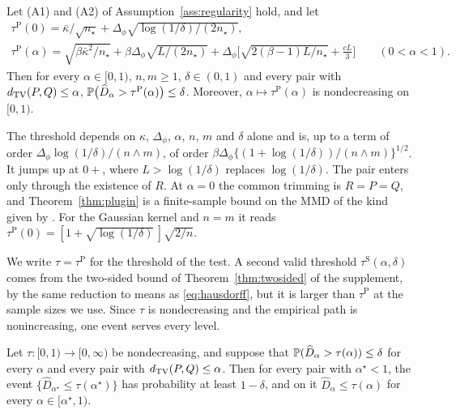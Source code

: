 \begin{theorem}
\label{thm:plugin}
Let (A1) and (A2) of Assumption~\ref{ass:regularity} hold, and let
\begin{gather*}
\tau^{\mathrm P}(0)=\bar\kappa/\sqrt{n_\star}+\Delta_\phi\sqrt{\log(1/\delta)/(2n_\star)},\\
\tau^{\mathrm P}(\alpha)=\sqrt{\beta \bar\kappa^2/n_\star}+\beta \Delta_\phi\sqrt{L/(2n_\star)}+\Delta_\phi\Big[\sqrt{2(\beta-1)L/n_\star}+\frac{cL}3\Big]
\qquad(0<\alpha<1).
\end{gather*}
Then for every $\alpha\in[0,1)$, $n,m\ge1$, $\delta\in(0,1)$ and every pair with $d_{\mathrm{TV}}(P,Q)\le\alpha$,
$\mathbb{P}\big(\widehat D_\alpha>\tau^{\mathrm P}(\alpha)\big)\le\delta$. Moreover, $\alpha\mapsto\tau^{\mathrm P}(\alpha)$
is nondecreasing on $[0,1)$.
\end{theorem}

The threshold depends on $\kappa$, $\Delta_\phi$, $\alpha$, $n$, $m$ and $\delta$ alone and is, up to a term of order
$\Delta_\phi\log(1/\delta)/(n\wedge m)$, of order $\beta \Delta_\phi\{(1+\log(1/\delta))/(n\wedge m)\}^{1/2}$. It
jumps up at $0+$, where $L>\log(1/\delta)$ replaces $\log(1/\delta)$. The pair enters only through the existence of $R$. At
$\alpha=0$ the common trimming is $R=P=Q$, and Theorem~\ref{thm:plugin} is a finite-sample bound on the MMD of the
kind given by \citet[Corollary~9]{gretton2012kernel}. For the Gaussian kernel and $n=m$ it reads
$\tau^{\mathrm P}(0)=[1+\sqrt{\log(1/\delta)}\,]\sqrt{2/n}$.

We write $\tau=\tau^{\mathrm P}$ for the threshold of the test. A second valid threshold $\tau^{\mathrm S}(\alpha,\delta)$
comes from the two-sided bound of Theorem~\ref{thm:twosided} of the supplement, by the same reduction to means as
\eqref{eq:hausdorff}, but it is larger than $\tau^{\mathrm P}$ at the sample sizes we use. Since $\tau$ is
nondecreasing and the empirical path is nonincreasing, one event serves every level.

\begin{lemma}
\label{lem:oneevent}
Let $\tau:[0,1)\to[0,\infty)$ be nondecreasing, and suppose that $\mathbb{P}(\widehat D_\alpha>\tau(\alpha))\le\delta$ for
every $\alpha$ and every pair with $d_{\mathrm{TV}}(P,Q)\le\alpha$. Then for every pair with $\alpha^\star<1$, the event
$\{\widehat D_{\alpha^\star}\le\tau(\alpha^\star)\}$ has probability at least $1-\delta$, and on it
$\widehat D_\alpha\le\tau(\alpha)$ for every $\alpha\in[\alpha^\star,1)$.
\end{lemma}

